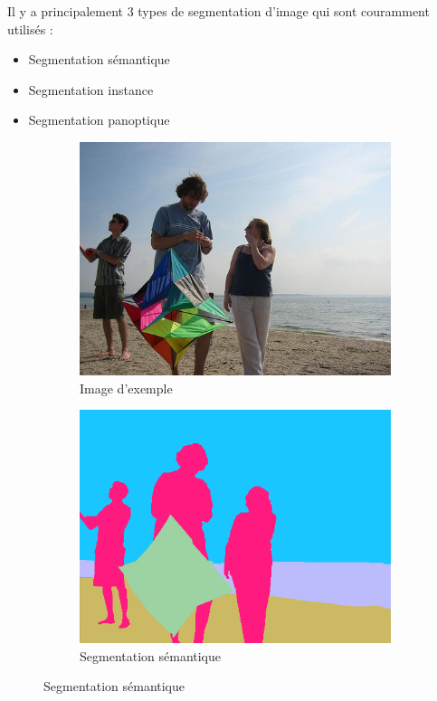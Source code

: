 Il y a principalement 3 types de segmentation d'image qui sont couramment utilisés :
\begin{itemize}
    \item Segmentation sémantique
    \item Segmentation instance
    \item Segmentation panoptique
\end{itemize}

\begin{figure}[H]
    \centering
    
    \begin{subfigure}[b]{0.48\textwidth}
        \centering
        \includegraphics[width=\textwidth]{03-tail//A1_fondamentaux_ML//A1_figures/A1_26_segmentation_image_exemple.png}
        \caption{Image d'exemple}
        \label{fig:A1_26_segmentation_image_exemple}
    \end{subfigure}
    \hfill
    \begin{subfigure}[b]{0.48\textwidth}
        \centering
        \includegraphics[width=\textwidth]{03-tail//A1_fondamentaux_ML//A1_figures/A1_27_segmentation_semantique.png}
        \caption{Segmentation sémantique}
        \label{fig:A1_27_segmentation_semantique}
    \end{subfigure}
    

\end{figure}
